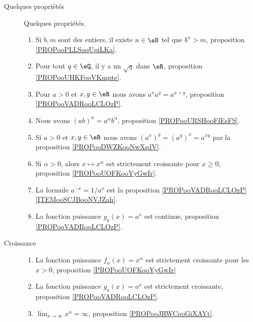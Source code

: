 \begin{description}
	\item[Quelques propriétés]
		Quelques propriétés.
		\begin{enumerate}
			\item
			      Si \( b,m\) sont des entiers, il existe \( n\in \eN\) tel que \( b^n>m\), proposition \ref{PROPooPLLSooUpiLKa}.
			\item
			      Pour tout \( q\in \eQ\), il y a un \( \sqrt{ q }\) dans \( \eR\), proposition \ref{PROPooUHKFooVKmpte}.
			\item
			      Pour \( a>0\) et \( x,y\in \eR\) nous avons \( a^xa^y=a^{x+y}\), proposition \ref{PROPooVADRooLCLOzP}.
			\item
			      Nous avons \( (ab)^{\alpha}=a^{\alpha}b^{\alpha}\), proposition \ref{PROPooURSHooFfEsFS}.
			\item
			      Si \( a>0\) et \( x,y\in \eR\) nous avons \( (a^x)^y=(a^y)^x=a^{xy}\) par la proposition \ref{PROPooDWZKooNwXsdV}.
			\item
			      Si \( \alpha>0\), alors \( x\mapsto x^{\alpha}\) est strictement croissante pour \( x\geq 0\), proposition \ref{PROPooUOFKooYyGwIr}.
			\item
			      La formule \( a^{-x}=1/a^x\) est la proposition \ref{PROPooVADRooLCLOzP}\ref{ITEMooSCJBooNVJZah}.
			\item
			      La fonction puissance \( g_a(x)=a^x\) est continue, proposition \ref{PROPooVADRooLCLOzP}.
		\end{enumerate}
	\item[Croissance]
		\begin{enumerate}
			\item
			      La fonction puissance \( f_{\alpha}(x)=x^{\alpha}\) est strictement croissante pour les \( x>0\), proposition \ref{PROPooUOFKooYyGwIr}
			\item
			      La fonction puissance \( g_a(x)=a^x\) est strictement croissante, proposition \ref{PROPooVADRooLCLOzP}.
			\item
			      \( \lim_{x\to \infty} x^{\alpha}=\infty\), proposition \ref{PROPooJRWCooGiXAYt}.
		\end{enumerate}


\end{description}
